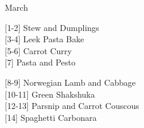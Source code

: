 		\begin{menu}{March}
    
    \begin{recipelist}
    
        {\scriptsize[1-2]} Stew and Dumplings\\
        {\scriptsize[3-4]} Leek Pasta Bake\\
        {\scriptsize[5-6]} Carrot Curry\\
        {\scriptsize[7]} Pasta and Pesto\\%
    \end{recipelist}%
    \begin{recipelist}
    
        {\scriptsize[8-9]} Norwegian Lamb and Cabbage\\
        {\scriptsize[10-11]} Green Shakshuka\\
        {\scriptsize[12-13]} Parsnip and Carrot Couscous\\
        {\scriptsize[14]} Spaghetti Carbonara\\%
    \end{recipelist}\par%
  

\end{menu}
